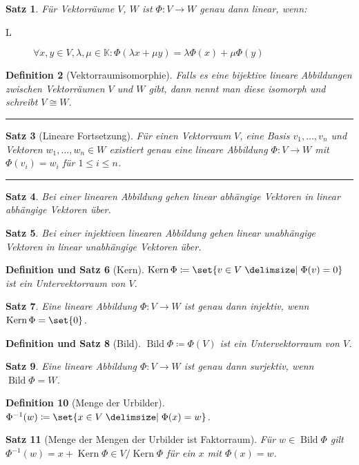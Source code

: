 \documentclass[a4paper]{article}
\newcounter{Sec}
\theoremstyle{marginbreak}
\newtheorem{definition}{Definition}[Sec]
\newtheorem{satz}[definition]{Satz}
\newtheorem{defsatz}[definition]{Definition und Satz}
\DeclareMathOperator{\Kern}{Kern}
\DeclareMathOperator{\Bild}{Bild}
\newcommand{\sep}{%
	\rule{\textwidth}{0.3pt}%
	\stepcounter{Sec}%
	}
\begin{document}
	\begin{satz}
		Für Vektorräume $V$, $W$ ist $\Phi\colon V\to W$ genau dann linear, wenn:
		\begin{description}
			\item[L] $\forall x, y\in V, \lambda, \mu\in\mathbb{K}: \Phi(\lambda x + \mu y) = \lambda\Phi(x) + \mu\Phi(y)$
		\end{description}
	\end{satz}
	\begin{definition}[Vektorraumisomorphie]
		Falls es eine bijektive lineare Abbildungen zwischen Vektorräumen $V$ und $W$
		gibt, dann nennt man diese isomorph und schreibt $V \cong W$.
	\end{definition}
	\sep
	\begin{satz}[Lineare Fortsetzung]
		Für einen Vektorraum $V$, eine Basis ${v_1,\ldots,v_n}$ und Vektoren
		$w_1,\ldots,w_n \in W$ existiert genau eine lineare Abbildung $\Phi\colon V\to W$
		mit $\Phi(v_i) = w_i$ für $ 1 \leq i \leq n$.
	\end{satz}
	\sep
	\begin{satz}
		Bei einer linearen Abbildung gehen linear abhängige Vektoren in linear
		abhängige Vektoren über.
	\end{satz}
	\begin{satz}
		Bei einer injektiven linearen Abbildung gehen linear unabhängige Vektoren in
		linear unabhängige Vektoren über.
	\end{satz}
	\begin{defsatz}[Kern]
		$\Kern\Phi\coloneqq\set{v\in V\given\Phi(v)=0}$ ist ein Untervektorraum von $V$.
	\end{defsatz}
	\begin{satz}
		Eine lineare Abbildung $\Phi\colon V\to W$ ist genau dann injektiv, wenn $\Kern\Phi = \set{0}$.
	\end{satz}
	\begin{defsatz}[Bild]
		$\Bild\Phi\coloneqq\Phi(V)$ ist ein Untervektorraum von $V$.
	\end{defsatz}
	\begin{satz}
		Eine lineare Abbildung $\Phi\colon V\to W$ ist genau dann surjektiv, wenn $\Bild\Phi = W$.
	\end{satz}
	\begin{definition}[Menge der Urbilder]
		$\Phi^{-1}(w)\coloneqq\set{x\in V\given\Phi(x)=w}$.
	\end{definition}
	\begin{satz}[Menge der Mengen der Urbilder ist Faktorraum]
		Für $w\in\Bild\Phi$ gilt $\Phi^{-1}(w) = x + \Kern\Phi \in V/\Kern\Phi$
		für ein $x$ mit $\Phi(x) = w$.
	\end{satz}
\end{document}
